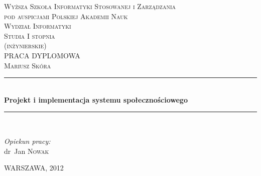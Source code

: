 \begin{titlepage}

\begin{center}


\textsc{\Large Wyższa Szkoła Informatyki Stosowanej i Zarządzania}\\[0.1cm]
\textsc{pod auspicjami Polskiej Akademii Nauk}\\[0.1cm]
\textsc{\Large Wydział Informatyki}\\[0.1cm]
\textsc{\large Studia I stopnia }\\
\textsc{\large (inżynierskie)}\\[1.5cm]
\textsc{\LARGE PRACA DYPLOMOWA}\\[1.5cm]

\textsc{\LARGE Mariusz Skóra}\\[0.5cm]


\rule{\linewidth}{0.5mm} \\[0.9cm]
{ \huge \bfseries Projekt i implementacja systemu społecznościowego}\\[0.4cm]

\rule{\linewidth}{0.5mm} \\[1.5cm]

\begin{minipage}{0.4\textwidth}
\begin{flushleft} \large

\end{flushleft}
\end{minipage}
\begin{minipage}{0.4\textwidth}
\begin{flushright} \large
\emph{Opiekun pracy:} \\
dr~Jan \textsc{Nowak}
\end{flushright}
\end{minipage}

\vfill

{\large WARSZAWA, 2012}

\end{center}

\end{titlepage}